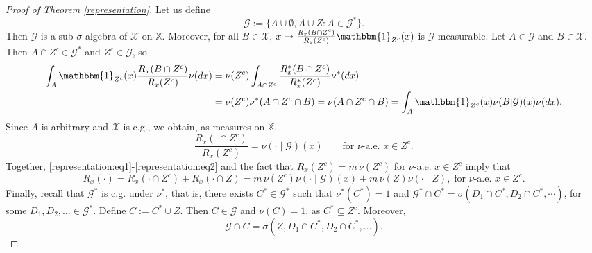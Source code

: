 \documentclass[a4paper]{article}
\theoremstyle{plain}
\theoremstyle{remark}
\theoremstyle{definition}
\begin{document}
\begin{proof}[Proof of Theorem \ref{representation}]
Let us define
\[\mathcal{G}:=\{A\cup\emptyset, A\cup Z: A\in \mathcal{G}^*\}.\]
Then $\mathcal{G}$ is a sub-$\sigma$-algebra of $\mathcal{X}$ on $\mathbb{X}$. Moreover, for all $B\in\mathcal{X}$, $x\mapsto\frac{R_x(B\cap Z^c)}{R_x(Z^c)}\mathbbm{1}_{Z^c}(x)$ is $\mathcal{G}$-measurable.
Let $A\in\mathcal{G}$ and $B\in\mathcal{X}$. Then $A\cap Z^c\in\mathcal{G}^*$ and $Z^c\in\mathcal{G}$, so
\begingroup\allowdisplaybreaks
\begin{align*}
\int_{A} \mathbbm{1}_{Z^c}(x) \frac{R_x(B\cap Z^c)}{R_x(Z^c)} \nu(dx)&= \nu(Z^c) \int_{A\cap Z^c} \frac{R^*_x(B\cap Z^c)}{R_x^*(Z^c)}\nu^*(dx)\\
&=\nu(Z^c)\nu^*(A\cap Z^c\cap B)=\nu(A\cap Z^c \cap B)=\int_A\mathbbm{1}_{Z^c}(x)\nu(B|\mathcal{G})(x)\nu(dx).    
\end{align*}
\endgroup
Since $A$ is arbitrary and $\mathcal{X}$ is c.g., we obtain, as measures on $\mathbb{X}$,
\begin{equation}\label{representation:eq2}
\frac{R_x(\cdot\cap Z^c)}{R_x(Z^c)}=\nu(\cdot\mid\mathcal{G})(x)\qquad\mbox{for }\nu\mbox{-a.e. }x\in Z^c.
\end{equation}
Together, \eqref{representation:eq1}-\eqref{representation:eq2} and the fact that $R_x(Z^c)=m\,\nu(Z^c)$ for $\nu$-a.e. $x\in Z^c$ imply that
\[R_x(\cdot) = R_x(\cdot \cap Z^c) + R_x( \cdot \cap Z) = m\,\nu(Z^c)\nu(\cdot\mid\mathcal{G})(x) + m\,\nu(Z)\nu(\cdot\mid Z),\;\mbox{for }\nu\mbox{-a.e. }x\in Z^c.\]
Finally, recall that $\mathcal{G}^*$ is c.g. under $\nu^*$, that is, there exists $C^*\in\mathcal{G}^*$ such that $\nu^*(C^*)=1$ and $\mathcal{G}^*\cap C^*=\sigma(D_1\cap C^*,D_2\cap C^*,\cdots)$, for some $D_1,D_2,\ldots\in\mathcal{G}^*$. Define $C:=C^*\cup Z$. Then $C\in\mathcal{G}$ and $\nu(C)=1$, as $C^*\subseteq Z^c$. Moreover,
\[\mathcal{G}\cap C=\sigma(Z,D_1\cap C^*,D_2\cap C^*,\ldots).\]


\end{proof}
\end{document}
